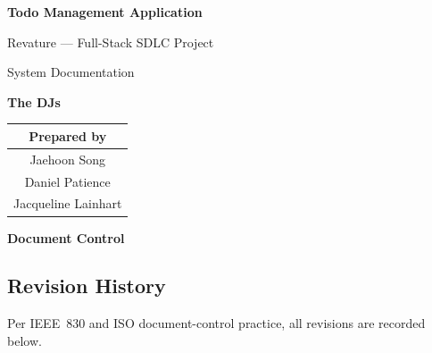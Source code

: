 
\thispagestyle{empty}
\begin{center}
  {\LARGE\bfseries Todo Management Application\par}
  \vspace{0.4cm}
  {\large Revature --- Full-Stack SDLC Project\par}
  \vspace{0.3cm}
  {\large System Documentation\par}
  \vspace{0.3cm}
  {\large\textbf{The DJs}\par}
\end{center}

\vspace{1cm}
\begin{center}
  \begin{tabular}{@{}c@{}}
    \toprule
    \textbf{Prepared by} \\
    \midrule
    Jaehoon Song \\
    Daniel Patience \\
    Jacqueline Lainhart \\
    \bottomrule
  \end{tabular}
\end{center}

\vspace{1.5cm}
\begin{center}
  {\large\bfseries Document Control}
\end{center}
\vspace{0.5cm}
\subsection*{Revision History}
Per IEEE~830 and ISO document-control practice, all revisions are recorded below.

